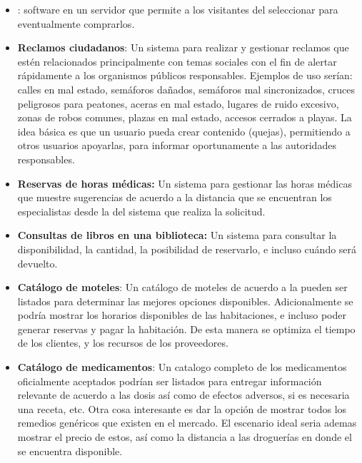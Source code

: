 		\begin{itemize}
			\item
				\textbf{\shoppingCart}: \ecommerceCOM software en un servidor \webINT que permite a los visitantes del \websiteINT seleccionar \itemsCOM para eventualmente comprarlos.
			
			\item
				\textbf{Reclamos ciudadanos}: Un sistema para realizar y gestionar reclamos que estén relacionados principalmente con temas sociales con el fin de alertar rápidamente a los organismos públicos responsables. Ejemplos de uso serían: calles en mal estado, semáforos dañados, semáforos mal sincronizados, cruces peligrosos para peatones, aceras en mal estado, lugares de ruido excesivo, zonas de robos comunes, plazas en mal estado, accesos cerrados a playas. La idea básica es que un usuario pueda crear contenido (quejas), permitiendo a otros usuarios apoyarlas, para informar oportunamente a las autoridades responsables.
			
			\item 
				\textbf{Reservas de horas médicas:} Un sistema para gestionar las horas médicas que muestre sugerencias de acuerdo a la distancia que se encuentran los especialistas desde la \geoPositionCPT del sistema que realiza la solicitud. 
			
			\item
				\textbf{Consultas de libros en una biblioteca:} Un sistema para consultar la disponibilidad, la cantidad, la posibilidad de reservarlo, e incluso cuándo será devuelto.

			\item
				\textbf{Catálogo de moteles}: Un catálogo de moteles de acuerdo a la \geoPositionCPT pueden ser listados para determinar las mejores opciones disponibles. Adicionalmente se podría mostrar los horarios disponibles de las habitaciones, e incluso poder generar reservas y pagar la habitación. De esta manera se optimiza el tiempo de los clientes, y los recursos de los proveedores.
			
			\item
				\textbf{Catálogo de medicamentos}: Un catalogo completo de los medicamentos oficialmente aceptados podrían ser listados para entregar información relevante de acuerdo a las dosis así como de efectos adversos, si es necesaria una receta, etc. Otra cosa interesante es dar la opción de mostrar todos los remedios genéricos que existen en el mercado. El escenario ideal seria ademas mostrar el precio de estos, así como la distancia a las droguerías en donde el \itemCOM se encuentra disponible.
			

\end{itemize}
